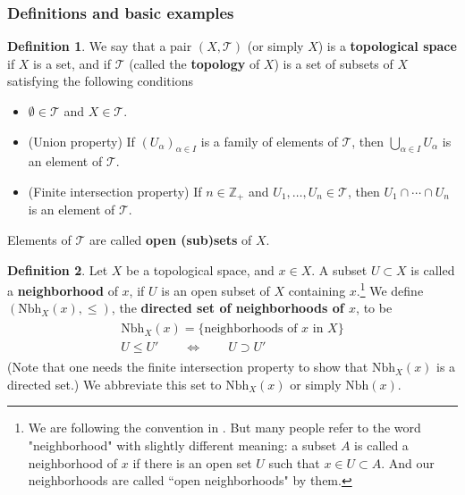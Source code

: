 \documentclass[12pt,b5paper,notitlepage]{article}
\theoremstyle{definition}
\newtheorem{df}{Definition}[section]
\theoremstyle{plain}
\newcommand{\mc}{\mathcal}
\newcommand{\Zbb}{\mathbb Z}
\newcommand{\Nbh}{\mathrm{Nbh}}
\numberwithin{equation}{section}
\begin{document}
\subsubsection{Definitions and basic examples}

\begin{df}\label{lb178}
We say that a pair $(X,\mc T)$ (or simply $X$) is a \textbf{topological space}  if $X$ is a set, and if $\mc T$ (called the \textbf{topology} of $X$) is a set of subsets of $X$ satisfying the following conditions
\begin{itemize}
\item $\emptyset\in\mc T$ and $X\in \mc T$.
\item (Union property) If $(U_\alpha)_{\alpha\in I}$ is a family of elements of $\mc T$, then $\bigcup_{\alpha\in I}U_\alpha$ is an element of $\mc T$.
\item (Finite intersection property) If $n\in\Zbb_+$ and $U_1,\dots,U_n\in\mc T$, then $U_1\cap\cdots\cap U_n$ is an element of $\mc T$.
\end{itemize}
Elements of $\mc T$ are called \textbf{open (sub)sets}  of $X$.
\end{df}


\begin{df}
Let $X$ be a topological space, and $x\in X$. A subset $U\subset X$ is called  a  \textbf{neighborhood} of $x$, if $U$ is an open subset of $X$ containing $x$.\footnote{We are following the convention in \cite{Mun,Rud-R}. But many people refer to the word "neighborhood" with slightly different meaning: a subset $A$ is called a neighborhood of $x$ if there is an open set $U$ such that $x\in U\subset A$. And our neighborhoods are called ``open neighborhoods" by them.} We define $(\Nbh_X(x),\leq)$, \index{Nbh@$\Nbh_X(x)=\Nbh(x)$}  the \textbf{directed set of neighborhoods of $x$},  to be 
\begin{gather}
\begin{gathered}
\Nbh_X(x)=\{\text{neighborhoods of }x\text{ in }X\}\\
U\leq U'\qquad\Longleftrightarrow \qquad U\supset U'
\end{gathered}
\end{gather} 
(Note that one needs the finite intersection property to show that $\Nbh_X(x)$ is a directed set.) We abbreviate this set to $\Nbh_X(x)$ or simply $\Nbh(x)$.
\end{df}
\end{document}
